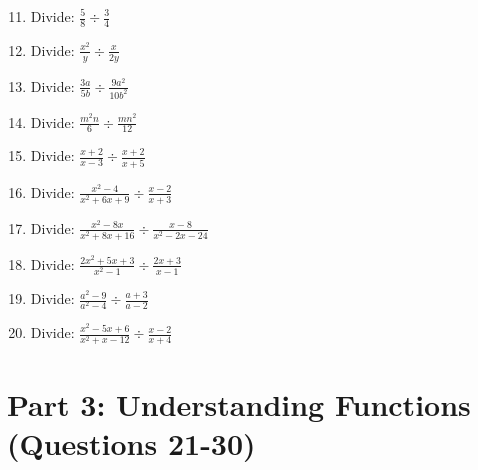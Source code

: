 \documentclass[12pt]{article}
\begin{document}
\begin{enumerate}
\setcounter{enumi}{10}

\item Divide: $\frac{5}{8} \div \frac{3}{4}$

\item Divide: $\frac{x^2}{y} \div \frac{x}{2y}$

\item Divide: $\frac{3a}{5b} \div \frac{9a^2}{10b^2}$

\item Divide: $\frac{m^2n}{6} \div \frac{mn^2}{12}$

\item Divide: $\frac{x+2}{x-3} \div \frac{x+2}{x+5}$

\item Divide: $\frac{x^2-4}{x^2+6x+9} \div \frac{x-2}{x+3}$

\item Divide: $\frac{x^2-8x}{x^2+8x+16} \div \frac{x-8}{x^2-2x-24}$

\item Divide: $\frac{2x^2+5x+3}{x^2-1} \div \frac{2x+3}{x-1}$

\item Divide: $\frac{a^2-9}{a^2-4} \div \frac{a+3}{a-2}$

\item Divide: $\frac{x^2-5x+6}{x^2+x-12} \div \frac{x-2}{x+4}$

\end{enumerate}

\section*{Part 3: Understanding Functions (Questions 21-30)}
\end{document}
